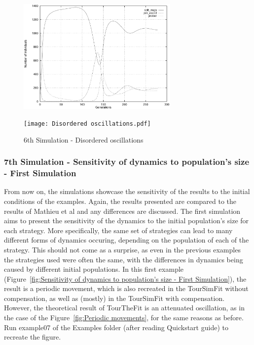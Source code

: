 	\begin{figure}[h]
	    \centering
		\includegraphics[width=0.7\textwidth]{RefPaperFigures/fig6.jpeg}\par\vspace{0.5em}
	    \texttt{[image: Disordered oscillations.pdf]}
	    \caption{6th Simulation - Disordered oscillations}
	    \label{fig:Disordered oscillations}
	\end{figure}

\subsubsection{7th Simulation - Sensitivity of dynamics to population's size - First Simulation}
From now on, the simulations showcase the sensitivity of the results to the initial conditions of the examples. Again, the results presented are compared to the results of Mathieu et al and any differences are discussed. The first simulation aims to present the sensitivity of the dynamics to the initial population's size for each strategy. More specifically, the same set of strategies can lead to many different forms of dynamics occuring, depending on the population of each of the strategy. This should not come as a surprise, as even in the previous examples the strategies used were often the same, with the differences in dynamics being caused by different initial populations. In this first example (Figure~\ref{fig:Sensitivity of dynamics to population's size - First Simulation}), the result is a periodic movement, which is also recreated in the TourSimFit without compensation, as well as (mostly) in the TourSimFit with compensation. However, the theoretical result of TourTheFit is an attenuated oscillation, as in the case of the Figure~\ref{fig:Periodic movements}, for the same reasons as before. Run example07 of the Examples folder (after reading Quickstart guide) to recreate the figure.

